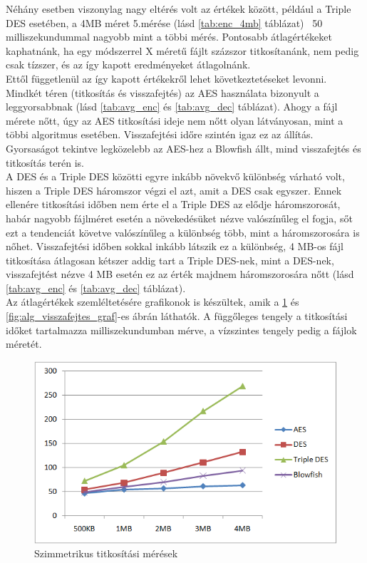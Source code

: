 \noindent Néhány esetben viszonylag nagy eltérés volt az értékek között, például a Triple DES esetében, a 4MB méret 5.mérése (lásd \ref{tab:enc_4mb} táblázat) ~50 milliszekundummal nagyobb mint a többi mérés. Pontosabb átlagértékeket kaphatnánk, ha egy módszerrel X méretű fájlt százszor titkosítanánk, nem pedig csak tízszer, és az így kapott eredményeket átlagolnánk.
\vspace{5pt}\\Ettől függetlenül az így kapott értékekről lehet következtetéseket levonni.
\vspace{5pt}\\Mindkét téren (titkosítás és visszafejtés) az AES használata bizonyult a leggyorsabbnak (lásd \ref{tab:avg_enc} és \ref{tab:avg_dec} táblázat). Ahogy a fájl mérete nőtt, úgy az AES titkosítási ideje nem nőtt olyan látványosan, mint a többi algoritmus esetében. Visszafejtési időre szintén igaz ez az állítás. 
\vspace{5pt}\\Gyorsaságot tekintve legközelebb az AES-hez a Blowfish állt, mind visszafejtés és titkosítás terén is. 
\vspace{5pt}\\A DES és a Triple DES közötti egyre inkább növekvő különbség várható volt, hiszen a Triple DES háromszor végzi el azt, amit a DES csak egyszer. Ennek ellenére titkosítási időben nem érte el a Triple DES az elődje háromszorosát, habár nagyobb fájlméret esetén a növekedésüket nézve valószínűleg el fogja, sőt ezt a tendenciát követve valószínűleg a különbség több, mint a háromszorosára is nőhet. Visszafejtési időben sokkal inkább látszik ez a különbség, 4 MB-os fájl titkosítása átlagosan kétszer addig tart a Triple DES-nek, mint a DES-nek, visszafejtést nézve 4 MB esetén ez az érték majdnem háromszorosára nőtt (lásd \ref{tab:avg_enc} és \ref{tab:avg_dec} táblázat).
\vspace{5pt}\\ Az átlagértékek szemléltetésére grafikonok is készültek, amik a \ref{fig:alg_titkositas_graf} és \ref{fig:alg_visszafejtes_graf}-es ábrán láthatók. A függőleges tengely a titkosítási időket tartalmazza milliszekundumban mérve, a vízszintes tengely pedig a fájlok méretét.
\begin{figure}[H]
	\centering
	\includegraphics[scale=0.8]{images/alg_graf_1.png}
	\caption{Szimmetrikus titkosítási mérések}
	\label{fig:alg_titkositas_graf}
\end{figure}

